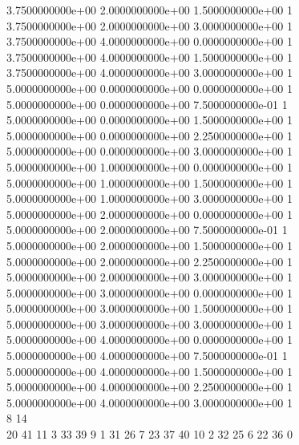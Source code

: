 \documentclass[12pt]{book}
\begin{document}
{3.7500000000e+00 2.0000000000e+00 1.5000000000e+00 1\\
3.7500000000e+00 2.0000000000e+00 3.0000000000e+00 1\\
3.7500000000e+00 4.0000000000e+00 0.0000000000e+00 1\\
3.7500000000e+00 4.0000000000e+00 1.5000000000e+00 1\\
3.7500000000e+00 4.0000000000e+00 3.0000000000e+00 1\\
5.0000000000e+00 0.0000000000e+00 0.0000000000e+00 1\\
5.0000000000e+00 0.0000000000e+00 7.5000000000e-01 1\\
5.0000000000e+00 0.0000000000e+00 1.5000000000e+00 1\\
5.0000000000e+00 0.0000000000e+00 2.2500000000e+00 1\\
5.0000000000e+00 0.0000000000e+00 3.0000000000e+00 1\\
5.0000000000e+00 1.0000000000e+00 0.0000000000e+00 1\\
5.0000000000e+00 1.0000000000e+00 1.5000000000e+00 1\\
5.0000000000e+00 1.0000000000e+00 3.0000000000e+00 1\\
5.0000000000e+00 2.0000000000e+00 0.0000000000e+00 1\\
5.0000000000e+00 2.0000000000e+00 7.5000000000e-01 1\\
5.0000000000e+00 2.0000000000e+00 1.5000000000e+00 1\\
5.0000000000e+00 2.0000000000e+00 2.2500000000e+00 1\\
5.0000000000e+00 2.0000000000e+00 3.0000000000e+00 1\\
5.0000000000e+00 3.0000000000e+00 0.0000000000e+00 1\\
5.0000000000e+00 3.0000000000e+00 1.5000000000e+00 1\\
5.0000000000e+00 3.0000000000e+00 3.0000000000e+00 1\\
5.0000000000e+00 4.0000000000e+00 0.0000000000e+00 1\\
5.0000000000e+00 4.0000000000e+00 7.5000000000e-01 1\\
5.0000000000e+00 4.0000000000e+00 1.5000000000e+00 1\\
5.0000000000e+00 4.0000000000e+00 2.2500000000e+00 1\\
5.0000000000e+00 4.0000000000e+00 3.0000000000e+00 1\\
8 14\\
20 41 11 3 33 39 9 1 31 26 7 23 37 40 10 2 32 25 6 22 36   0\\
}
\end{document}
